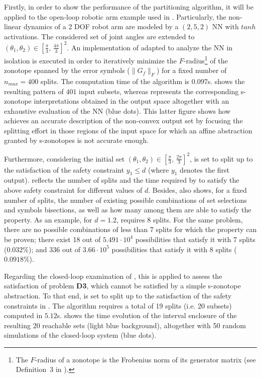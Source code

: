\documentclass[journal]{IEEEtran}
\begin{document}
Firstly, in order to show the performance of the partitioning algorithm, it will be applied to the open-loop robotic arm example used in \cite{xiang2020reachable,everett2020robustness}. Particularly, the non-linear dynamics of a 2 DOF robot arm are modeled by a $(2,5,2)$ NN with $tanh$ activations. The considered set of joint angles are extended to $(\theta_1,\theta_2) \in [\frac{\pi}{3}, \, \frac{4\pi}{3}]^2$. An  implementation of  adapted to analyze the NN in isolation is executed in order to iteratively minimize the $F$-radius\footnote{The $F$-radius of a zonotope is the Frobenius norm of its generator matrix (see Definition~3 in \cite{combastel2015zonotopes}).} of the zonotope spanned by the error symbols ($\|G_f\|_F$) for a fixed number of $n_{max} = 400$ splits. The computation time of the algorithm is $0.097$s.  shows the resulting pattern of $401$ input subsets, whereas  represents the corresponding s-zonotope interpretations obtained in the output space altogether with an exhaustive evaluation of the NN (blue dots). This latter figure shows how  achieves an accurate description of the non-convex output set by focusing the splitting effort in those regions of the input space for which an affine abstraction granted by s-zonotopes is not accurate enough.

Furthermore, considering the initial set $(\theta_1,\theta_2) \in [\frac{\pi}{3}, \, \frac{2\pi}{3}]^2$,  is set to split up to the satisfaction of the safety constraint $y_1 \leq d$ (where $y_1$ denotes the first output).   reflects the number of splits and the time required by  to satisfy the above safety constraint for different values of $d$. Besides,  also shows, for a fixed number of splits, the number of existing possible combinations of set selections and symbols bisections, as well as how many among them are able to satisfy the property. As an example, for $d = 1.2$,  requires $8$ splits. For the same problem, there are no possible combinations of less than 7 splits for which the property can be proven; there exist 18 out of $5.491\cdot 10^4$ possibilities that satisfy it with 7 splits ($0.032\%$); and 336 out of $3.66\cdot 10^5$ possibilities that satisfy it with 8 splits ($0.0918\%$). 

Regarding the closed-loop examination of , this is applied to assess the satisfaction of problem \textbf{D3}, which cannot be satisfied by a simple s-zonotope abstraction. To that end,  is set to split up to the satisfaction of the safety constraints in . The algorithm requires a total of 19 splits (i.e. 20 subsets) computed in $5.12$s.  shows the time evolution of the interval enclosure of the resulting 20 reachable sets (light blue background), altogether with 50 random simulations of the closed-loop system (blue dots).
\end{document}
